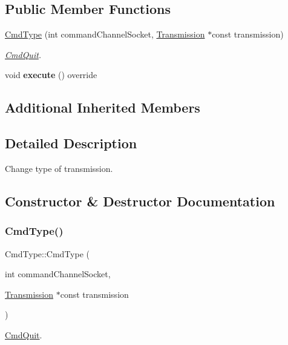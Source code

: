 \subsection*{Public Member Functions}
\begin{DoxyCompactItemize}
\item 
\hyperlink{classCmdType_a5e667300d7e4ae811601ce120708423f}{Cmd\+Type} (int command\+Channel\+Socket, \hyperlink{classTransmission}{Transmission} $\ast$const transmission)
\begin{DoxyCompactList}\small\item\em \hyperlink{classCmdQuit}{Cmd\+Quit}. \end{DoxyCompactList}\item 
\mbox{\label{classCmdType_a5d8e3af14974a4fc05356d8af008463d}} 
void {\bfseries execute} () override
\end{DoxyCompactItemize}
\subsection*{Additional Inherited Members}


\subsection{Detailed Description}
Change type of transmission. 

\subsection{Constructor \& Destructor Documentation}
\mbox{\label{classCmdType_a5e667300d7e4ae811601ce120708423f}} 
\subsubsection{\texorpdfstring{Cmd\+Type()}{CmdType()}}
{\footnotesize\ttfamily Cmd\+Type\+::\+Cmd\+Type (\begin{DoxyParamCaption}\item[{int}]{command\+Channel\+Socket,  }\item[{\hyperlink{classTransmission}{Transmission} $\ast$const}]{transmission }\end{DoxyParamCaption})}



\hyperlink{classCmdQuit}{Cmd\+Quit}. 


